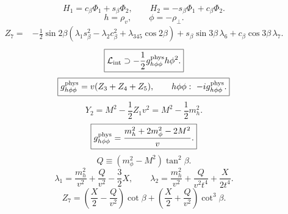 \begin{equation}
\boxed{H_1=c_\beta\Phi_1+s_\beta\Phi_2,\qquad H_2=-s_\beta\Phi_1+c_\beta\Phi_2.}
\label{eq:higgs_basis_definition}
\end{equation}
\begin{equation}
\boxed{h=\rho_v,\qquad \phi=-\rho_\perp.}
\label{eq:alignment_state_signs}
\end{equation}
\begin{align}
Z_7={}&-\frac12\sin2\beta
(\lambda_1s_\beta^2-\lambda_2c_\beta^2+\lambda_{345}\cos2\beta)
+s_\beta\sin3\beta\,\lambda_6+c_\beta\cos3\beta\,\lambda_7.
\label{eq:Z7_map}
\end{align}
\begin{equation}
\boxed{\mathcal L_{\rm int}\supset -\frac12g_{h\phi\phi}^{\rm phys}h\phi^2.}
\label{eq:hphiphi_definition}
\end{equation}
\begin{equation}
\boxed{g_{h\phi\phi}^{\rm phys}=v(Z_3+Z_4+Z_5),\qquad h\phi\phi:\ -ig_{h\phi\phi}^{\rm phys}.}
\label{eq:hphiphi_Z}
\end{equation}
\begin{equation}
Y_2=M^2-\frac12Z_1v^2=M^2-\frac12m_h^2.
\label{eq:Y2_alignment_M2}
\end{equation}
\begin{equation}
\boxed{g_{h\phi\phi}^{\rm phys}=\frac{m_h^2+2m_\phi^2-2M^2}{v}.}
\label{eq:hphiphi_physical_mass_form}
\end{equation}
\begin{equation}
\boxed{Q\equiv(m_\phi^2-M^2)\tan^2\beta.}
\label{eq:Q_definition}
\end{equation}
\begin{equation}
\lambda_1=\frac{m_h^2}{v^2}+\frac{Q}{v^2}-\frac32X,\qquad
\lambda_2=\frac{m_h^2}{v^2}+\frac{Q}{v^2t^4}+\frac{X}{2t^4}.
\label{eq:lambda12_XQ}
\end{equation}
\begin{equation}
\boxed{Z_7=\left(\frac X2-\frac{Q}{v^2}\right)\cot\beta+\left(\frac X2+\frac{Q}{v^2}\right)\cot^3\beta.}
\label{eq:Z7_XQ_exact}
\end{equation}
